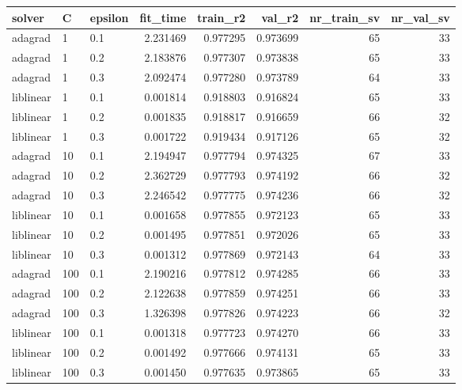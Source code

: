 \begin{tabular}{lllrrrrr}
\toprule
   solver &   C & epsilon &  fit\_time &  train\_r2 &   val\_r2 &  nr\_train\_sv &  nr\_val\_sv \\
\midrule
  adagrad &   1 &     0.1 &  2.231469 &  0.977295 & 0.973699 &           65 &         33 \\
  adagrad &   1 &     0.2 &  2.183876 &  0.977307 & 0.973838 &           65 &         33 \\
  adagrad &   1 &     0.3 &  2.092474 &  0.977280 & 0.973789 &           64 &         33 \\
liblinear &   1 &     0.1 &  0.001814 &  0.918803 & 0.916824 &           65 &         33 \\
liblinear &   1 &     0.2 &  0.001835 &  0.918817 & 0.916659 &           66 &         32 \\
liblinear &   1 &     0.3 &  0.001722 &  0.919434 & 0.917126 &           65 &         32 \\
  adagrad &  10 &     0.1 &  2.194947 &  0.977794 & 0.974325 &           67 &         33 \\
  adagrad &  10 &     0.2 &  2.362729 &  0.977793 & 0.974192 &           66 &         32 \\
  adagrad &  10 &     0.3 &  2.246542 &  0.977775 & 0.974236 &           66 &         32 \\
liblinear &  10 &     0.1 &  0.001658 &  0.977855 & 0.972123 &           65 &         33 \\
liblinear &  10 &     0.2 &  0.001495 &  0.977851 & 0.972026 &           65 &         33 \\
liblinear &  10 &     0.3 &  0.001312 &  0.977869 & 0.972143 &           64 &         33 \\
  adagrad & 100 &     0.1 &  2.190216 &  0.977812 & 0.974285 &           66 &         33 \\
  adagrad & 100 &     0.2 &  2.122638 &  0.977859 & 0.974251 &           66 &         33 \\
  adagrad & 100 &     0.3 &  1.326398 &  0.977826 & 0.974223 &           66 &         32 \\
liblinear & 100 &     0.1 &  0.001318 &  0.977723 & 0.974270 &           66 &         33 \\
liblinear & 100 &     0.2 &  0.001492 &  0.977666 & 0.974131 &           65 &         33 \\
liblinear & 100 &     0.3 &  0.001450 &  0.977635 & 0.973865 &           65 &         33 \\
\bottomrule
\end{tabular}
